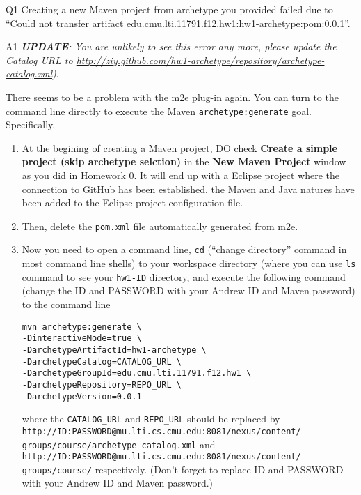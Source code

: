 \begin{qa}

\item[Q1] Creating a new Maven project from archetype you provided failed due to
``Could not transfer artifact
edu.cmu.lti.11791.f12.hw1:hw1-archetype:pom:0.0.1''.

\item[A1] \emph{\textbf{UPDATE}: You are unlikely to see this error any more,
please update the Catalog URL to
\url{http://ziy.github.com/hw1-archetype/repository/archetype-catalog.xml})}.

There seems to be a problem with the m2e plug-in again. You can turn to the
command line directly to execute the Maven \texttt{archetype:generate} goal.
Specifically,

\begin{enumerate}

\item At the begining of creating a Maven project, DO check
\textbf{Create a simple project (skip archetype selction)} in the \textbf{New Maven Project}
window as you did in Homework 0. It will end up with a Eclipse project where the
connection to GitHub has been established, the Maven and Java natures have been
added to the Eclipse project configuration file.

\item Then, delete the \verb|pom.xml| file automatically generated from m2e.

\item Now you need to open a command line, \verb|cd| (``change directory'' command in
most command line shells) to your workspace directory (where you can use
\verb|ls| command to see your \verb|hw1-ID| directory, and execute the following
command (change the ID and PASSWORD with your Andrew ID and Maven password) to
the command line

\small
\begin{verbatim}
mvn archetype:generate \
-DinteractiveMode=true \
-DarchetypeArtifactId=hw1-archetype \
-DarchetypeCatalog=CATALOG_URL \
-DarchetypeGroupId=edu.cmu.lti.11791.f12.hw1 \
-DarchetypeRepository=REPO_URL \
-DarchetypeVersion=0.0.1
\end{verbatim}
\normalsize

where the \verb|CATALOG_URL| and \verb|REPO_URL| should be replaced by
\verb|http://ID:PASSWORD@mu.lti.cs.cmu.edu:8081/nexus/content/|
\verb|groups/course/archetype-catalog.xml| and
\verb|http://ID:PASSWORD@mu.lti.cs.cmu.edu:8081/nexus/content/|
\verb|groups/course/| respectively. (Don't forget to replace ID and PASSWORD
with your Andrew ID and Maven password.)


\end{enumerate}
\end{qa}
